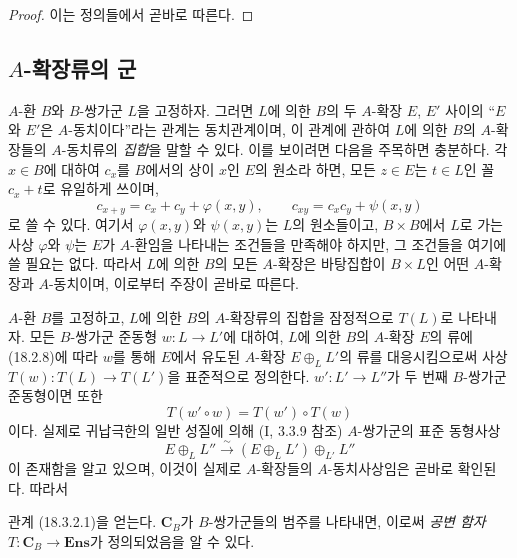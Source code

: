 \begin{proof}
이는 정의들에서 곧바로 따른다.
\end{proof}

\subsection{$A$-확장류의 군}
\label{subsection:0.18.3-fr}

\begin{env}[18.3.1]
\label{0.18.3.1-fr}
$A$-환 $B$와 $B$-쌍가군 $L$을 고정하자. 그러면 $L$에 의한 $B$의
두 $A$-확장 $E$, $E'$ 사이의 ``$E$와 $E'$은 $A$-동치이다''라는
관계는 동치관계이며, 이 관계에 관하여 $L$에 의한 $B$의
$A$-확장들의 $A$-동치류의 \emph{집합}을 말할 수 있다.
이를 보이려면 다음을 주목하면 충분하다. 각 $x\in B$에 대하여
$c_x$를 $B$에서의 상이 $x$인 $E$의 원소라 하면, 모든 $z\in E$는
$t\in L$인 꼴 $c_x+t$로 유일하게 쓰이며,
\[
  c_{x+y}=c_x+c_y+\varphi(x,y),\qquad
  c_{xy}=c_xc_y+\psi(x,y)
\]
로 쓸 수 있다. 여기서 $\varphi(x,y)$와 $\psi(x,y)$는 $L$의
원소들이고, $B\times B$에서 $L$로 가는 사상 $\varphi$와 $\psi$는
$E$가 $A$-환임을 나타내는 조건들을 만족해야 하지만, 그 조건들을
여기에 쓸 필요는 없다. 따라서 $L$에 의한 $B$의 모든 $A$-확장은
바탕집합이 $B\times L$인 어떤 $A$-확장과 $A$-동치이며, 이로부터
주장이 곧바로 따른다.
\end{env}

\begin{env}[18.3.2]
\label{0.18.3.2-fr}
$A$-환 $B$를 고정하고, $L$에 의한 $B$의 $A$-확장류의 집합을
잠정적으로 $T(L)$로 나타내자. 모든 $B$-쌍가군 준동형
$w:L\to L'$에 대하여, $L$에 의한 $B$의 $A$-확장 $E$의 류에
(18.2.8)에 따라 $w$를 통해 $E$에서 유도된 $A$-확장
$E\oplus_LL'$의 류를 대응시킴으로써 사상
$T(w):T(L)\to T(L')$을 표준적으로 정의한다. $w':L'\to L''$가
두 번째 $B$-쌍가군 준동형이면 또한
\begin{equation}
\label{0.18.3.2.1-fr}
\tag{18.3.2.1}
  T(w'\circ w)=T(w')\circ T(w)
\end{equation}
이다. 실제로 귀납극한의 일반 성질에 의해 ($\mathrm{I}$, 3.3.9 참조)
$A$-쌍가군의 표준 동형사상
\[
  E\oplus_LL''\xrightarrow{\sim}(E\oplus_LL')\oplus_{L'}L''
\]
이 존재함을 알고 있으며, 이것이 실제로 $A$-확장들의 $A$-동치사상임은
곧바로 확인된다. 따라서


관계 (18.3.2.1)을 얻는다. $\mathbf C_B$가 $B$-쌍가군들의 범주를
나타내면, 이로써 \emph{공변 함자}
$T:\mathbf C_B\to\mathbf{Ens}$가 정의되었음을 알 수 있다.
\end{env}

